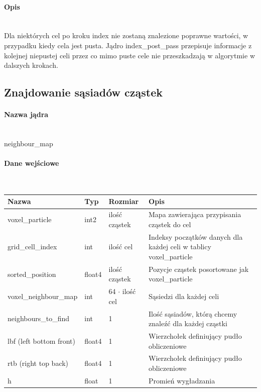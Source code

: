 \documentclass[polish, 12pt]{aghthesis}
\begin{document}
				\paragraph{Opis} \ \\
					\indent Dla niektórych cel po kroku index nie zostaną znalezione poprawne wartości, w przypadku kiedy cela jest pusta. Jądro index\_post\_pass przepisuje informacje z kolejnej niepustej celi przez co mimo puste cele nie przeszkadzają w algorytmie w dalszych krokach.
					
		\subsection{Znajdowanie sąsiadów cząstek}
			\paragraph{Nazwa jądra} \ \\
					neighbour\_map
				\paragraph{Dane wejściowe} \ \\
					\begin{tabular}{| p{} | p{} | p{} | p{} |}
					\hline
						Nazwa & Typ & Rozmiar & Opis \\
					\hline
						voxel\_particle & int2 & ilość cząstek & Mapa zawierająca przypisania cząstek do cel \\ 
					\hline
						grid\_cell\_index & int & ilość cel & Indeksy początków danych dla każdej celi w tablicy voxel\_particle \\
					\hline
						sorted\_position & float4 & ilość cząstek & Pozycje cząstek posortowane jak voxel\_particle\\
					\hline
						voxel\_neighbour\_map & int & 64 ${\cdot}$ ilość cel & Sąsiedzi dla każdej celi \\ 
					\hline
						neighbours\_to\_find & int & 1 & Ilość sąsiadów, którą chcemy znaleźć dla każdej cząstki \\ 
					\hline
						lbf (left bottom front)& float4 & 1 & Wierzchołek definiujący pudło obliczeniowe \\ 
					\hline
						rtb (right top back) & float4 & 1 & Wierzchołek definiujący pudło obliczeniowe  \\ 
					\hline
						h & float & 1 & Promień wygładzania \\ 
					\hline	
				\end{tabular}
\end{document}

